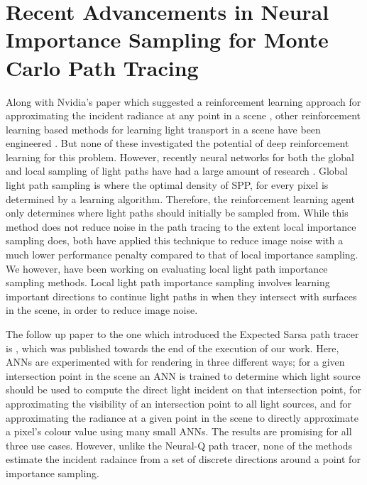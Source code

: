 \documentclass[../dissertation.tex]{subfiles}
\begin{document}
\section{Recent Advancements in Neural Importance Sampling for Monte Carlo Path Tracing}
\label{sec:recent_advancements}


Along with Nvidia's paper which suggested a reinforcement learning approach for approximating the incident radiance at any point in a scene \cite{dahm2017learning}, other reinforcement learning based methods for learning light transport in a scene have been engineered \cite{muller2017practical, vorba2014line}. But none of these investigated the potential of deep reinforcement learning for this problem. However, recently neural networks for both the global and local sampling of light paths have had a large amount of research \cite{zheng2018learning, muller2018neural, keller2019integral, hermosilla2018deep}. Global light path sampling is where the optimal density of SPP, for every pixel is determined by a learning algorithm. Therefore, the reinforcement learning agent only determines where light paths should initially be sampled from. While this method does not reduce noise in the path tracing to the extent local importance sampling does, both \cite{muller2017practical, zheng2018learning} have applied this technique to reduce image noise with a much lower performance penalty compared to that of local importance sampling. We however, have been working on evaluating local light path importance sampling methods. Local light path importance sampling involves learning important directions to continue light paths in when they intersect with surfaces in the scene, in order to reduce image noise.

 The follow up paper to the one which introduced the Expected Sarsa path tracer \cite{dahm2017learning} is \cite{keller2019integral}, which was published towards the end of the execution of our work. Here, ANNs are experimented with for rendering in three different ways; for a given intersection point in the scene an ANN is trained to determine which light source should be used to compute the direct light incident on that intersection point, for approximating the visibility of an intersection point to all light sources, and for approximating the radiance at a given point in the scene to directly approximate a pixel's colour value using many small ANNs. The results are promising for all three use cases. However, unlike the Neural-Q path tracer, none of the methods estimate the incident radaince from a set of discrete directions around a point for importance sampling.
 
\end{document}
